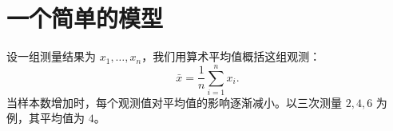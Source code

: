 \section{一个简单的模型}
设一组测量结果为 $x_1,\ldots,x_n$，我们用算术平均值概括这组观测：
\begin{equation}
  \bar{x} = \frac{1}{n}\sum_{i=1}^{n} x_i .
\end{equation}
当样本数增加时，每个观测值对平均值的影响逐渐减小。以三次测量 $2,4,6$ 为例，其平均值为 $4$。
